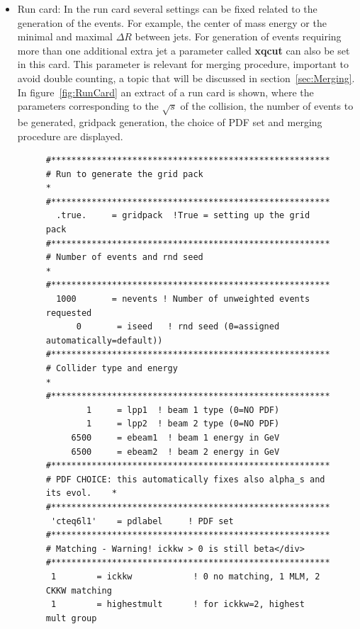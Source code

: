 \begin{itemize}
\begin{itemize}
  \item Run card: In the run card several settings can be fixed related to the generation of the events. For example, the center of mass energy or the minimal and maximal $\Delta R$ between jets. For generation of events requiring more than one additional extra jet a parameter called \textbf{xqcut} can also be set in this card. This parameter is relevant for merging procedure, important to avoid double counting, a topic that will be discussed in section~\ref{sec:Merging}. In figure~\ref{fig:RunCard} an extract of a run card is shown, where the parameters corresponding to the $\sqrt{s}$ of the collision, the number of events to be generated, gridpack generation, the choice of PDF set and merging procedure are displayed.
    \begin{figure}[!Hhtbp]
      \begin{center}
        \begin{minipage}[c]{0.7\textwidth}
\scriptsize
\begin{verbatim}
#*********************************************************************
# Run to generate the grid pack                                      *
#*********************************************************************
  .true.     = gridpack  !True = setting up the grid pack
#*********************************************************************
# Number of events and rnd seed                                      *
#*********************************************************************
  1000       = nevents ! Number of unweighted events requested 
      0       = iseed   ! rnd seed (0=assigned automatically=default))
#*********************************************************************
# Collider type and energy                                           *
#*********************************************************************
        1     = lpp1  ! beam 1 type (0=NO PDF)
        1     = lpp2  ! beam 2 type (0=NO PDF)
     6500     = ebeam1  ! beam 1 energy in GeV
     6500     = ebeam2  ! beam 2 energy in GeV
#*********************************************************************
# PDF CHOICE: this automatically fixes also alpha_s and its evol.    *
#*********************************************************************
 'cteq6l1'    = pdlabel     ! PDF set  
#*********************************************************************
# Matching - Warning! ickkw > 0 is still beta</div>
#*********************************************************************
 1        = ickkw            ! 0 no matching, 1 MLM, 2 CKKW matching
 1        = highestmult      ! for ickkw=2, highest mult group

\end{verbatim}
\end{minipage}
\end{center}
\end{figure}
\end{itemize}
\end{itemize}
